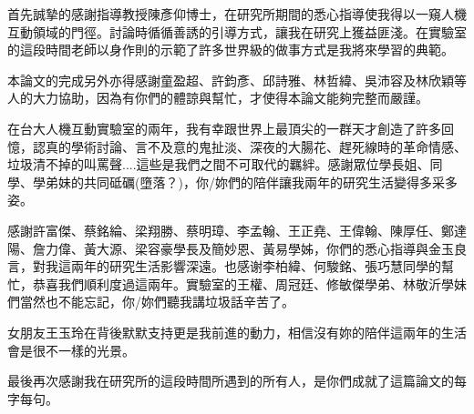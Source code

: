 \begin{acknowledgementszh}
首先誠摯的感謝指導教授陳彥仰博士，在研究所期間的悉心指導使我得以一窺人機互動領域的門徑。討論時循循善誘的引導方式，讓我在研究上獲益匪淺。在實驗室的這段時間老師以身作則的示範了許多世界級的做事方式是我將來學習的典範。

本論文的完成另外亦得感謝童盈超、許鈞彥、邱詩雅、林哲緯、吳沛容及林欣穎等人的大力協助，因為有你們的體諒與幫忙，才使得本論文能夠完整而嚴謹。

在台大人機互動實驗室的兩年，我有幸跟世界上最頂尖的一群天才創造了許多回憶，認真的學術討論、言不及意的鬼扯淡、深夜的大腸花、趕死線時的革命情感、垃圾清不掉的叫罵聲....這些是我們之間不可取代的羈絆。感謝眾位學長姐、同學、學弟妹的共同砥礪(墮落？)，你/妳們的陪伴讓我兩年的研究生活變得多采多姿。

感謝許富傑、蔡銘綸、梁翔勝、蔡明璋、李孟翰、王正堯、王偉翰、陳厚任、鄭達陽、詹力偉、黃大源、梁容豪學長及簡妙恩、黃易學姊，你們的悉心指導與金玉良言，對我這兩年的研究生活影響深遠。也感谢李柏緯、何駿銘、張巧慧同學的幫忙，恭喜我們順利度過這兩年。實驗室的王權、周冠廷、修敏傑學弟、林敬沂學妹們當然也不能忘記，你/妳們聽我講垃圾話辛苦了。


女朋友王玉玲在背後默默支持更是我前進的動力，相信沒有妳的陪伴這兩年的生活會是很不一樣的光景。

最後再次感謝我在研究所的這段時間所遇到的所有人，是你們成就了這篇論文的每字每句。


\end{acknowledgementszh}

